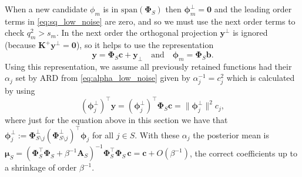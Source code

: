 \documentclass[a4paper]{article}
\renewcommand{\vec}[1]{\boldsymbol{#1}}
\begin{document}
When a new candidate $\phi_m$ is in $\mathrm{span}(\mathbf \Phi_S)$ then $\vec \phi_m^\perp = \mathbf 0$ and the leading order terms in \eqref{eq:sq_low_noise} are zero, and so we must use the next order terms to check $q_m^2 > s_m$. In the next order the orthogonal projection $\vec y^\perp$ is ignored (because $\mathbf K^{\!+} \vec y^\perp = \vec 0$), so it helps to use the representation 
\begin{equation}
    \vec y = \mathbf \Phi_S \mathbf c + \mathbf y_\perp \quad \text{and} \quad 
    \vec \phi_m = \mathbf \Phi_S \vec b.
\end{equation}
Using this representation, we assume all previously retained functions had their $\alpha_j$ set by ARD from \eqref{eq:alpha_low_noise} given by $\alpha_j^{-1} = c_j^2$ which is calculated by using  
\[
(\vec \phi_j^\perp)^\top \vec y = (\vec \phi_j^\perp)^\top \mathbf \Phi_S \mathbf c = \|\vec \phi_j^\perp\|^2 c_j,
\]
where just for the equation above in this section we have that $\vec \phi_j^\perp := \mathbf \Phi_{S\setminus j}^\perp (\mathbf \Phi_{S\setminus j}^\perp)^\top \vec \phi_j$ for all $j \in S$. With these $\alpha_j$ the posterior mean is $\vec \mu_S = (\mathbf \Phi_S^\top \mathbf \Phi_S + \beta^{-1} \mathbf A_S)^{-1} \mathbf \Phi_S^\top \mathbf \Phi_S \, \mathbf c = \mathbf c + O(\beta^{-1})$, the correct coefficients up to a shrinkage of order $\beta^{-1}$. 
\end{document}
